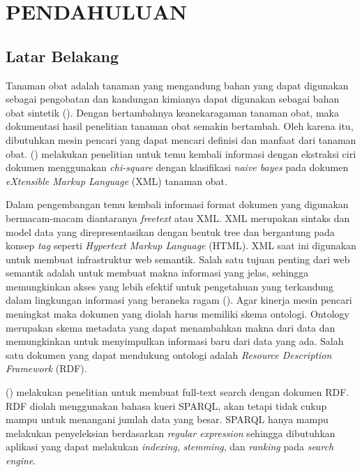 \section*{PENDAHULUAN} %
\subsection*{Latar Belakang}
Tanaman obat adalah tanaman yang mengandung bahan yang dapat digunakan sebagai pengobatan dan kandungan kimianya dapat digunakan sebagai bahan obat sintetik (\cite{DEPTAN}). Dengan bertambahnya keanekaragaman tanaman obat, maka dokumentasi hasil penelitian tanaman obat semakin bertambah. Oleh karena itu, dibutuhkan mesin pencari yang dapat mencari definisi dan manfaat dari tanaman obat. \citeauthor{HERAWAN} (\cite*{HERAWAN}) melakukan penelitian untuk temu kembali informasi dengan ekstraksi ciri dokumen menggunakan \textit{chi-square} dengan klasifikasi \textit{naive bayes} pada dokumen \textit{eXtensible Markup Language} (XML) tanaman obat.

Dalam pengembangan temu kembali informasi format dokumen yang digunakan bermacam-macam diantaranya \textit{freetext} atau XML. XML merupakan sintaks dan model data yang direpresentasikan dengan bentuk tree dan bergantung pada konsep \textit{tag} seperti \textit{Hypertext Markup Language} (HTML). XML saat ini digunakan untuk membuat infrastruktur web semantik. Salah satu tujuan penting dari web semantik adalah untuk membuat makna informasi yang jelas, sehingga memungkinkan akses yang lebih efektif untuk pengetahuan yang terkandung dalam lingkungan informasi yang beraneka ragam (\cite{LEI}). Agar kinerja mesin pencari meningkat maka dokumen yang diolah harus memiliki skema ontologi. Ontology merupakan skema metadata yang dapat menambahkan makna dari data dan memungkinkan untuk menyimpulkan informasi baru dari data yang ada. Salah satu dokumen yang dapat mendukung ontologi adalah \textit{Resource Description Framework} (RDF).

\citeauthor{MINACK} (\cite*{MINACK}) melakukan penelitian untuk membuat full-text search dengan dokumen RDF. RDF diolah menggunakan bahasa kueri SPARQL, akan tetapi tidak cukup mampu untuk menangani jumlah data yang besar. SPARQL hanya mampu melakukan penyeleksian berdasarkan \textit{regular expression} sehingga dibutuhkan aplikasi yang dapat melakukan \textit{indexing}, \textit{stemming}, dan \textit{ranking} pada \textit{search engine}.


